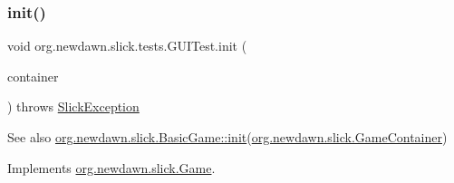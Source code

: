 \subsubsection{\texorpdfstring{init()}{init()}}
{\footnotesize\ttfamily void org.\+newdawn.\+slick.\+tests.\+G\+U\+I\+Test.\+init (\begin{DoxyParamCaption}\item[{\mbox{\hyperlink{classorg_1_1newdawn_1_1slick_1_1_game_container}{Game\+Container}}}]{container }\end{DoxyParamCaption}) throws \mbox{\hyperlink{classorg_1_1newdawn_1_1slick_1_1_slick_exception}{Slick\+Exception}}\hspace{0.3cm}{\ttfamily [inline]}}

\begin{DoxySeeAlso}{See also}
\mbox{\hyperlink{classorg_1_1newdawn_1_1slick_1_1_basic_game_a8af0900217e4d389249f71367b22d114}{org.\+newdawn.\+slick.\+Basic\+Game\+::init}}(\mbox{\hyperlink{classorg_1_1newdawn_1_1slick_1_1_game_container}{org.\+newdawn.\+slick.\+Game\+Container}}) 
\end{DoxySeeAlso}


Implements \mbox{\hyperlink{interfaceorg_1_1newdawn_1_1slick_1_1_game_ad2dd6affab08bb8fdb5fab0815957b7a}{org.\+newdawn.\+slick.\+Game}}.


